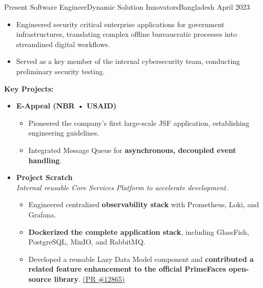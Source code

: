 \vspace{-2em}

\begin{experiences}
  \experience
    {Present}   {Software Engineer}{Dynamic Solution Innovators}{Bangladesh}
    {April 2023} {
      \begin{itemize}
        \item Engineered security critical enterprise applications for government infrastructures, translating complex offline bureaucratic processes into streamlined digital workflows.
        \item Served as a key member of the internal cybersecurity team, conducting preliminary security testing.
      \end{itemize}

    \vspace{0.5em}

      \textbf{Key Projects:}
      \begin{itemize}[leftmargin=1.3em,label={}]
        \vspace{0.3em}
        \item \textbf{E-Appeal (NBR • USAID)}
        \begin{itemize}
          \item Pioneered the company's first large-scale JSF application, establishing engineering guidelines.
          \item Integrated Message Queue for \textbf{asynchronous, decoupled event handling}.
        \end{itemize}

      \vspace{0.3em}
        \item \textbf{Project Scratch} \\
        {\small\textit{Internal reusable Core Services Platform to accelerate development.}}
        \begin{itemize}
          \item Engineered centralized \textbf{observability stack} with Prometheus, Loki, and Grafana.
          \item \textbf{Dockerized the complete application stack}, including GlassFish, PostgreSQL, MinIO, and RabbitMQ.
          \item Developed a reusable Lazy Data Model component and \textbf{contributed a related feature enhancement to the official PrimeFaces open-source library}.
          \href{https://github.com/primefaces/primefaces/pull/12865}{(PR \#12865)}
        \end{itemize}


\end{itemize}}
\end{experiences}
